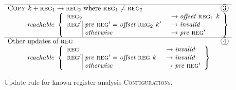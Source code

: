 \begin{figure}
\begin{displaymath}
\begin{array}{l}
      \hline
      \textsc{Copy } k + \textsc{reg}_1 \rightarrow \textsc{reg}_2 \textrm{ where } \textsc{reg}_1 \not= \textsc{reg}_2 \hfill \circled{3}\\
      \hspace{10mm}\textit{reachable }\left\{\begin{array}{ll}
        \textsc{reg}_2 & \!\!\!\rightarrow \textit{offset }\textsc{reg}_1 \textit{ k} \\
        \textsc{reg}' \multirow{2}{*}{\begin{math}
            \left|\hspace{-1mm}\begin{array}{l}
              \textit{pre }\textsc{reg}' = \textit{offset }\textsc{reg}_2 \textit{ } k' \\
              \textit{otherwise}\\
            \end{array}\right.
          \end{math}
        } & \!\!\!\rightarrow \mathit{invalid}\\
          & \!\!\!\rightarrow \textit{pre }\textsc{reg}'\\
      \end{array}\right\}\\

      \hline
      \textrm{Other updates of }\textsc{reg} \hfill \circled{4}\\
      \hspace{10mm}\textit{reachable }\left\{\begin{array}{ll}
        \textsc{reg} & \!\!\!\rightarrow \textit{invalid} \\
        \textsc{reg}' \multirow{2}{*}{\begin{math}
            \left|\hspace{-1mm}\begin{array}{l}
              \textit{pre }\textsc{reg}' = \textit{offset }\textsc{reg} \textit{ } k \\
              \textit{otherwise}\\
            \end{array}\right.
          \end{math}
        } & \!\!\!\rightarrow \mathit{invalid}\\
          & \!\!\!\rightarrow \textit{pre }\textsc{reg}'\\
      \end{array}\right\}\\
      
    \end{array}
  \end{displaymath}
  \caption{Update rule for known register analysis \textsc{Configuration}s.}
  \label{fig:known_regs:update_rule}
\end{figure}

